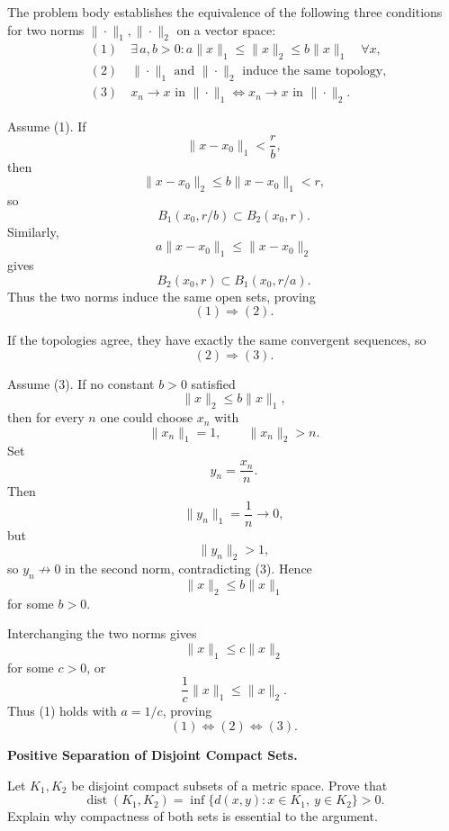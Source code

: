 \begin{solution}
The problem body establishes the equivalence of the following three conditions for two norms
\(\|\cdot\|_1,\|\cdot\|_2\) on a vector space:
\[
\begin{aligned}
&(1)\quad
\exists\,a,b>0:
a\|x\|_1\le\|x\|_2\le b\|x\|_1
\quad\forall x,\\
&(2)\quad
\|\cdot\|_1\text{ and }\|\cdot\|_2
\text{ induce the same topology},\\
&(3)\quad
x_n\to x\text{ in }\|\cdot\|_1
\iff
x_n\to x\text{ in }\|\cdot\|_2.
\end{aligned}
\]

Assume (1). If
\[
\|x-x_0\|_1<\frac{r}{b},
\]
then
\[
\|x-x_0\|_2
\le
b\|x-x_0\|_1<r,
\]
so
\[
B_1(x_0,r/b)\subset B_2(x_0,r).
\]
Similarly,
\[
a\|x-x_0\|_1\le\|x-x_0\|_2
\]
gives
\[
B_2(x_0,r)\subset B_1(x_0,r/a).
\]
Thus the two norms induce the same open sets, proving
\[
(1)\Rightarrow(2).
\]

If the topologies agree, they have exactly the same convergent sequences, so
\[
(2)\Rightarrow(3).
\]

Assume (3). If no constant \(b>0\) satisfied
\[
\|x\|_2\le b\|x\|_1,
\]
then for every \(n\) one could choose \(x_n\) with
\[
\|x_n\|_1=1,
\qquad
\|x_n\|_2>n.
\]
Set
\[
y_n=\frac{x_n}{n}.
\]
Then
\[
\|y_n\|_1=\frac1n\to0,
\]
but
\[
\|y_n\|_2>1,
\]
so \(y_n\not\to0\) in the second norm, contradicting (3). Hence
\[
\|x\|_2\le b\|x\|_1
\]
for some \(b>0\).

Interchanging the two norms gives
\[
\|x\|_1\le c\|x\|_2
\]
for some \(c>0\), or
\[
\frac1c\|x\|_1\le\|x\|_2.
\]
Thus (1) holds with \(a=1/c\), proving
\[
\boxed{(1)\Longleftrightarrow(2)\Longleftrightarrow(3).}
\]
\end{solution}


\begin{problem}[CP-II-0153]
\label{prob:cp-ii-0153}
\textbf{Positive Separation of Disjoint Compact Sets.}

\hspace*{1.5em}Let \(K_1,K_2\) be disjoint compact subsets of a metric space. Prove that
\[
\operatorname{dist}(K_1,K_2)
=
\inf\{d(x,y):x\in K_1,\ y\in K_2\}
>0.
\]
Explain why compactness of both sets is essential to the argument.
\end{problem}

